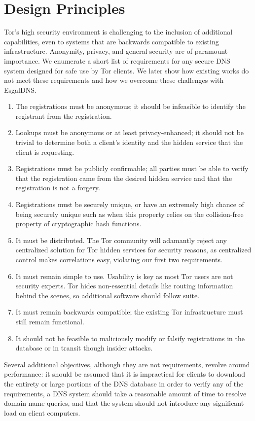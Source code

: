 \section{Design Principles}

Tor's high security environment is challenging to the inclusion of additional capabilities, even to systems that are backwards compatible to existing infrastructure. Anonymity, privacy, and general security are of paramount importance. We enumerate a short list of requirements for any secure DNS system designed for safe use by Tor clients. We later show how existing works do not meet these requirements and how we overcome these challenges with EsgalDNS.

\begin{enumerate}
	\item The registrations must be anonymous; it should be infeasible to identify the registrant from the registration.
	\item Lookups must be anonymous or at least privacy-enhanced; it should not be trivial to determine both a client's identity and the hidden service that the client is requesting.
	\item Registrations must be publicly confirmable; all parties must be able to verify that the registration came from the desired hidden service and that the registration is not a forgery. %
	\item Registrations must be securely unique, or have an extremely high chance of being securely unique such as when this property relies on the collision-free property of cryptographic hash functions.
	\item It must be distributed. The Tor community will adamantly reject any centralized solution for Tor hidden services for security reasons, as centralized control makes correlations easy, violating our first two requirements.
	\item It must remain simple to use. Usability is key as most Tor users are not security experts. Tor hides non-essential details like routing information behind the scenes, so additional software should follow suite. %
	\item It must remain backwards compatible; the existing Tor infrastructure must still remain functional.
	\item It should not be feasible to maliciously modify or falsify registrations in the database or in transit though insider attacks.
\end{enumerate}

Several additional objectives, although they are not requirements, revolve around performance: it should be assumed that it is impractical for clients to download the entirety or large portions of the DNS database in order to verify any of the requirements, a DNS system should take a reasonable amount of time to resolve domain name queries, and that the system should not introduce any significant load on client computers.
